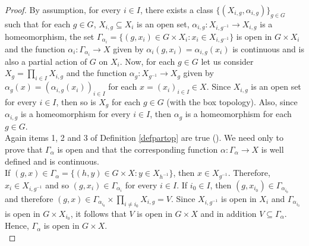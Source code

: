 \documentclass[sn-mathphys-num]{sn-jnl}%
\theoremstyle{thmstyleone}%
\theoremstyle{thmstyletwo}%
\theoremstyle{thmstylethree}%
\begin{document}
\begin{proof}
By assumption, for every $i \in I $, there exists a class $ \{(X_ {i, g}, \alpha_{i, g}) \}_{g \in G} $ such that for each $ g \in G $, $ X_{i, g} \subseteq X_i $ is an open set, $ \alpha_ {i, g}: X_{i, g^{-1}} \to X_{i, g} $ is a homeomorphism, the set $ \Gamma_{\alpha_i} = \{ (g, x_i) \in G \times X_i: x_i \in X_{i,g^{- 1}} \}$ is open in $ G \times X_i $ and the function $ \alpha_i: \Gamma_{\alpha_i} \to X $ given by $ \alpha_i (g, x_i) = \alpha_{i, g} (x_i) $ is continuous and is also a partial action  of $ G $ on $ X_i $.
Now, for each $ g \in G $ let us consider $ X_ {g} = \prod_{i \in I} X_ {i, g} $ and the function $ \alpha_ {g}: X_{g^{-1}} \to X_{g} $ given by $ \alpha_g(x) = (\alpha_{i, g} (x_i))_{i \in I} $ for each $ x = (x_i)_{i \in I} \in X $.
Since $ X_ {i, g} $ is an open set for every  $ i \in I $, then so is $ X_g $ for each $ g \in G $ (with the box topology).
Also, since $ \alpha_{i, g} $ is a homeomorphism for every $ i \in I $, then $ \alpha_g $ is a homeomorphism for each $ g \in G $.\\


Again  items 1, 2 and 3 of Definition \ref{defpartop} are true (\cite{Avila1}). We need only to prove that $\Gamma_{\alpha}$ is open and that the corresponding function $ \alpha: \Gamma_{\alpha} \to X $ is well defined and is continuous.\\


If $ (g, x) \in \Gamma_{\alpha} = \{(h, y) \in G \times X: y \in X_{h^{- 1}}\}$, then $ x \in X_{g^{- 1}} $. Therefore, $ x_i \in X_ {i, g^{- 1}} $  and so $ (g, x_i)  \in \Gamma_{\alpha_{i}} $ for every  $ i \in I $. If $ i_0 \in I $, then $ (g, x_ {i_0}) \in \Gamma_{\alpha_{i_0}} $ and therefore $ (g, x) \in \Gamma_{\alpha_{i_0 }} \times \prod_{i \neq i_0} X_{i, g} = V $. Since $ X_{i, g^{- 1}} $ is open in $ X_i $ and $\Gamma_{\alpha_{i_0}}$ is open in $ G \times X_{i_0} $, it follows that $ V $ is open in $ G \times X $ and in addition $ V \subseteq \Gamma_\alpha $. Hence, $ \Gamma_{\alpha}$  is open in $ G \times X $.\\


\end{proof}
\end{document}
